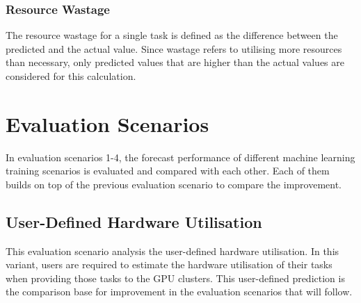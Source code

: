 

    \subsubsection{Resource Wastage}
    \label{sec:resource-wastage-metric-evaluation}

      The resource wastage for a single task is defined as the difference between the predicted and the actual value. Since wastage refers to utilising more resources than necessary, only predicted values that are higher than the actual values are considered for this calculation.

\section{Evaluation Scenarios}
\label{sec:evaluation-scenarios}

    In evaluation scenarios 1-4, the forecast performance of different machine learning training scenarios is evaluated and compared with each other. Each of them builds on top of the previous evaluation scenario to compare the improvement.

  \subsection{User-Defined Hardware Utilisation}
  \label{sec:user-defined-hardware-utilisation}

      This evaluation scenario analysis the user-defined hardware utilisation. 
      In this variant, users are required to estimate the hardware utilisation of their tasks when providing those tasks to the GPU clusters.
      This user-defined prediction is the comparison base for improvement in the evaluation scenarios that will follow.

